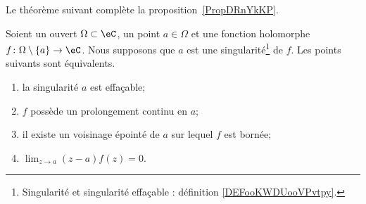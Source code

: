 Le théorème suivant complète la proposition~\ref{PropDRnYkKP}.
\begin{theorem}    \label{ThoTLQOEwW}
	Soient un ouvert \( \Omega\subset \eC\), un point \( a\in \Omega \) et une fonction holomorphe \( f\colon \Omega\setminus\{ a \}\to \eC\). Nous supposons que \( a\) est une singularité\footnote{Singularité et singularité effaçable : définition \ref{DEFooKWDUooVPvtpy}.} de \( f\). Les points suivants sont équivalents.
	\begin{enumerate}
		\item       \label{ITEMooMLXJooMfuifN}
		      la singularité \( a\) est effaçable;
		\item       \label{ITEMooBWPEooEltHAa}
		      \( f\) possède un prolongement continu en \( a\);
		\item       \label{ITEMooEAUOooIWcxHS}
		      il existe un voisinage épointé de \( a\) sur lequel \( f\) est bornée;
		\item       \label{ITEMooETRWooDTTpxs}
		      \( \lim_{z\to a}(z-a)f(z)=0\).
	\end{enumerate}
\end{theorem}

